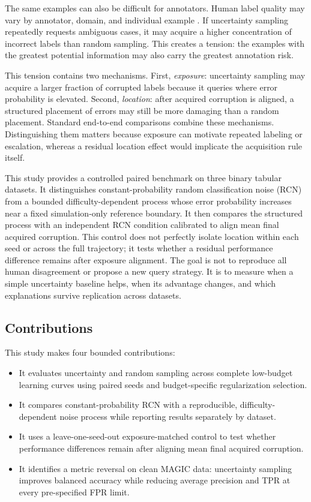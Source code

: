 \documentclass[11pt]{article}
\begin{document}
The same examples can also be difficult for annotators. Human label quality
may vary by annotator, domain, and individual example
\citep{yan2011,cheng2021,frenay2014}.
If uncertainty sampling repeatedly requests ambiguous cases, it may acquire a
higher concentration of incorrect labels than random sampling. This creates a
tension: the examples with the greatest potential information may also carry
the greatest annotation risk.

This tension contains two mechanisms. First, \emph{exposure}: uncertainty
sampling may acquire a larger fraction of corrupted labels because it queries
where error probability is elevated. Second, \emph{location}: after acquired
corruption is aligned, a structured placement of errors may still be more
damaging than a random placement. Standard end-to-end comparisons combine
these mechanisms. Distinguishing them matters because exposure can motivate
repeated labeling or escalation, whereas a residual location effect would
implicate the acquisition rule itself.

This study provides a controlled paired benchmark on three binary tabular
datasets. It distinguishes constant-probability random classification noise
(RCN) from a bounded difficulty-dependent process whose error probability
increases near a fixed simulation-only reference boundary. It then compares
the structured process with an independent RCN condition calibrated to align
mean final acquired corruption. This control does not perfectly isolate
location within each seed or across the full trajectory; it tests whether a
residual performance difference remains after exposure alignment. The goal is
not to reproduce all human disagreement or propose a new query strategy. It is
to measure when a simple uncertainty baseline helps, when its advantage
changes, and which explanations survive replication across datasets.

\subsection{Contributions}

This study makes four bounded contributions:

\begin{itemize}
  \item It evaluates uncertainty and random sampling across complete
  low-budget learning curves using paired seeds and budget-specific
  regularization selection.
  \item It compares constant-probability RCN with a reproducible,
  difficulty-dependent noise process while reporting results separately by
  dataset.
  \item It uses a leave-one-seed-out exposure-matched control to test whether
  performance differences remain after aligning mean final acquired
  corruption.
  \item It identifies a metric reversal on clean MAGIC data: uncertainty
  sampling improves balanced accuracy while reducing average precision and
  TPR at every pre-specified FPR limit.
\end{itemize}
\end{document}
